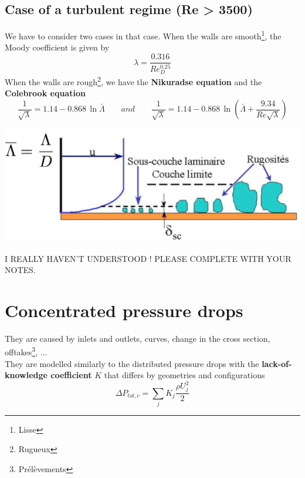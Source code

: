 	\subsection{Case of a turbulent regime (Re > 3500)}
		We have to consider two cases in that case. When the walls are smooth\footnote{Lisse}, the Moody coefficient is given by 
		\begin{equation}
			\lambda = \frac{0.316}{Re_D^{0.25}}
		\end{equation}
		When the walls are rough\footnote{Rugueux}, we have the \textbf{Nikuradse equation} and the \textbf{Colebrook equation}
		\begin{equation}
			\frac{1}{\sqrt{\lambda}} = 1.14 - 0.868 \, \ln \bar{\Lambda}
			\qquad and \qquad
			\frac{1}{\sqrt{\lambda}} = 1.14 - 0.868 \, \ln \left(\bar{\Lambda}+\frac{9.34}{Re\sqrt{\lambda}} \right)
		\end{equation}
\begin{center}
		\includegraphics[scale=0.4]{ch2/7}
\end{center}
I REALLY HAVEN'T UNDERSTOOD ! PLEASE COMPLETE WITH YOUR NOTES.

\section{Concentrated pressure drops}
	They are caused by inlets and outlets, curves, change in the cross section, offtakes\footnote{Prélèvements}, ... \\
	They are modelled similarly to the distributed pressure drops with the \textbf{lack-of-knowledge coefficient} $K$ that differs by geometries and configurations
	\begin{equation}
		\Delta P_{tot,c} = \sum _j K_j \frac{\rho U_j^2}{2}
	\end{equation}
	
